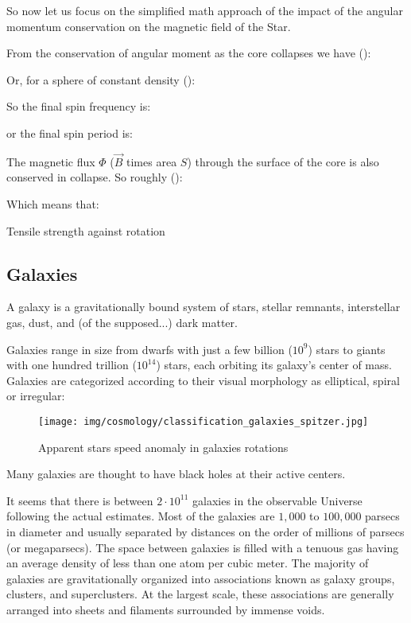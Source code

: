 	So now let us focus on the simplified math approach of the impact of the angular momentum conservation on the magnetic field of the Star. 
	
	From the conservation of angular moment as the core collapses we have ():
	
	Or,  for a sphere of constant density  ():
	
	So the final spin frequency is:
	
	or the final spin period is:
	
	The magnetic flux $\Phi$ ($\vec{B}$ times area $S$) through the surface of the core is also conserved in collapse. So roughly   ():
	
	Which means that:
	
	
	Tensile strength against rotation \\
	
	\subsection{Galaxies}
	A galaxy is a gravitationally bound system of stars, stellar remnants, interstellar gas, dust, and (of the supposed...) dark matter. 

	Galaxies range in size from dwarfs with just a few billion ($10^9$) stars to giants with one hundred trillion ($10^{14}$) stars, each orbiting its galaxy's center of mass. Galaxies are categorized according to their visual morphology as elliptical, spiral or irregular:
	\begin{figure}[H]
		\begin{center}
		\texttt{[image: img/cosmology/classification\_galaxies\_spitzer.jpg]}
		\end{center}	
		\caption{Apparent stars speed anomaly in galaxies rotations}
	\end{figure}
	 Many galaxies are thought to have black holes at their active centers. 

	It seems that there is between $2\cdot 10^{11}$ galaxies in the observable Universe following the actual estimates. Most of the galaxies are $1,000$ to $100,000$ parsecs in diameter and usually separated by distances on the order of millions of parsecs (or megaparsecs). The space between galaxies is filled with a tenuous gas having an average density of less than one atom per cubic meter. The majority of galaxies are gravitationally organized into associations known as galaxy groups, clusters, and superclusters. At the largest scale, these associations are generally arranged into sheets and filaments surrounded by immense voids.
	
